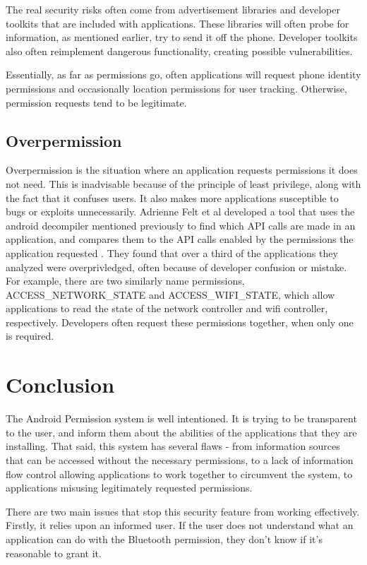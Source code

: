 \documentclass[12pt,pdftex]{article}
\begin{document}
\begin{doublespace}
The real security risks often come from advertisement libraries and developer toolkits that are included with applications.  These libraries will often probe for information, as mentioned earlier, try to send it off the phone.  Developer toolkits also often reimplement dangerous functionality, creating possible vulnerabilities.

Essentially, as far as permissions go, often applications will request phone identity permissions and occasionally location permissions for user tracking.  Otherwise, permission requests tend to be legitimate.

\subsection{Overpermission}
Overpermission is the situation where an application requests permissions it does not need.  This is inadvisable because of the principle of least privilege, along with the fact that it confuses users.  It also makes more applications susceptible to bugs or exploits unnecessarily.  Adrienne Felt et al developed a tool that uses the android decompiler mentioned previously \cite{ded} to find which API calls are made in an application, and compares them to the API calls enabled by the permissions the application requested \cite{felt11}.  They found that over a third of the applications they analyzed were overprivledged, often because of developer confusion or mistake.  For example, there are two similarly name permissions, ACCESS\_NETWORK\_STATE and ACCESS\_WIFI\_STATE, which allow applications to read the state of the network controller and wifi controller, respectively.  Developers often request these permissions together, when only one is required.

\section{Conclusion}
The Android Permission system is well intentioned.  It is trying to be transparent to the user, and inform them about the abilities of the applications that they are installing.  That said, this system has several flaws - from information sources that can be accessed without the necessary permissions, to a lack of information flow control allowing applications to work together to circumvent the system, to applications misusing legitimately requested permissions.

There are two main issues that stop this security feature from working effectively.  Firstly, it relies upon an informed user.  If the user does not understand what an application can do with the Bluetooth permission, they don't know if it's reasonable to grant it.  


\end{doublespace}
\end{document}
